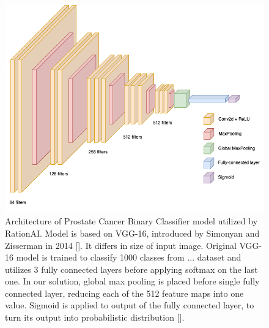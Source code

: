 \begin{figure}[!h]
    \begin{center}
    \begin{minipage}{0.75\textwidth}
      \includegraphics[width=\textwidth]{img/nn-arch.png}
    \end{minipage}
    \caption{Architecture of Prostate Cancer Binary Classifier model utilized by RationAI. Model is based on VGG-16, introduced by Simonyan and Zisserman in 2014 []. It differs in size of input image. Original VGG-16 model is trained to classify 1000 classes from ... dataset and utilizes 3 fully connected layers before applying softmax on the last one. In our solution, global max pooling is placed before single fully connected layer, reducing each of the 512 feature maps into one value. Sigmoid is applied to output of the fully connected layer, to turn its output into probabilistic distribution [].}
    \label{fig:rationai-vgg16}
    \end{center}

\end{figure}

